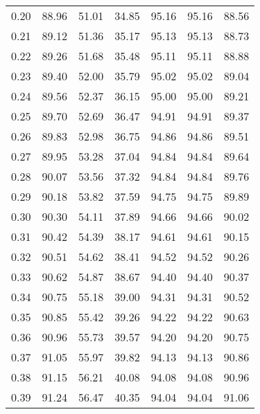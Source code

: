 \begin{tabular}{|c|c|c|c|c|c|c|}
      0.20 &     88.96 &     51.01 &      34.85 &   95.16 &      95.16 &         88.56 \\
      0.21 &     89.12 &     51.36 &      35.17 &   95.13 &      95.13 &         88.73 \\
      0.22 &     89.26 &     51.68 &      35.48 &   95.11 &      95.11 &         88.88 \\
      0.23 &     89.40 &     52.00 &      35.79 &   95.02 &      95.02 &         89.04 \\
      0.24 &     89.56 &     52.37 &      36.15 &   95.00 &      95.00 &         89.21 \\
      0.25 &     89.70 &     52.69 &      36.47 &   94.91 &      94.91 &         89.37 \\
      0.26 &     89.83 &     52.98 &      36.75 &   94.86 &      94.86 &         89.51 \\
      0.27 &     89.95 &     53.28 &      37.04 &   94.84 &      94.84 &         89.64 \\
      0.28 &     90.07 &     53.56 &      37.32 &   94.84 &      94.84 &         89.76 \\
      0.29 &     90.18 &     53.82 &      37.59 &   94.75 &      94.75 &         89.89 \\
      0.30 &     90.30 &     54.11 &      37.89 &   94.66 &      94.66 &         90.02 \\
      0.31 &     90.42 &     54.39 &      38.17 &   94.61 &      94.61 &         90.15 \\
      0.32 &     90.51 &     54.62 &      38.41 &   94.52 &      94.52 &         90.26 \\
      0.33 &     90.62 &     54.87 &      38.67 &   94.40 &      94.40 &         90.37 \\
      0.34 &     90.75 &     55.18 &      39.00 &   94.31 &      94.31 &         90.52 \\
      0.35 &     90.85 &     55.42 &      39.26 &   94.22 &      94.22 &         90.63 \\
      0.36 &     90.96 &     55.73 &      39.57 &   94.20 &      94.20 &         90.75 \\
      0.37 &     91.05 &     55.97 &      39.82 &   94.13 &      94.13 &         90.86 \\
      0.38 &     91.15 &     56.21 &      40.08 &   94.08 &      94.08 &         90.96 \\
      0.39 &     91.24 &     56.47 &      40.35 &   94.04 &      94.04 &         91.06 \\

\end{tabular}
